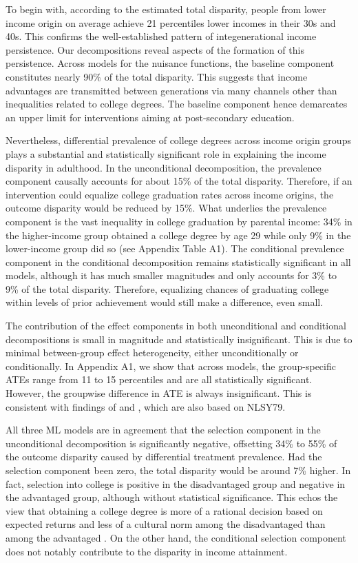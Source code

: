 \documentclass[12pt,a4paper]{article}
\begin{document}
To begin with, according to the estimated total disparity, people from lower income origin on average achieve 21 percentiles lower incomes in their 30s and 40s. This confirms the well-established pattern of integenerational income persistence. Our decompositions reveal aspects of the formation of this persistence. Across models for the nuisance functions, the baseline component constitutes nearly 90\% of the total disparity. This suggests that income advantages are transmitted between generations via many channels other than inequalities related to college degrees. The baseline component hence demarcates an upper limit for interventions aiming at  post-secondary education.

Nevertheless, differential prevalence of college degrees across income origin groups plays a substantial and statistically significant role in explaining the income disparity in adulthood. In the unconditional decomposition, the prevalence component causally accounts for about 15\% of the total disparity. Therefore, if an intervention could equalize college graduation rates across income origins, the outcome disparity would be reduced by 15\%. What underlies the prevalence component is the vast inequality in college graduation by parental income: 34\% in the higher-income group obtained a college degree by age 29 while only 9\% in the lower-income group did so (see Appendix Table A1). The conditional prevalence component in the conditional decomposition remains statistically significant in all models, although it has much smaller magnitudes and only accounts for 3\% to 9\% of the total disparity. Therefore, equalizing chances of graduating college within levels of prior achievement would still make a difference, even small.

The contribution of the effect components in both unconditional and conditional decompositions is small in magnitude and statistically insignificant. This is due to minimal between-group effect heterogeneity, either unconditionally or conditionally. In Appendix A1, we show that across models, the group-specific ATEs range from 11 to 15 percentiles and are all statistically significant. However, the groupwise difference in ATE is always insignificant. This is consistent with findings of \citet{zhou_equalization_2019} and \citet{fiel_great_2020}, which are also based on NLSY79. 

All three ML models are in agreement that the selection component in the unconditional decomposition is significantly negative, offsetting 34\% to 55\% of the outcome disparity caused by differential treatment prevalence. Had the selection component been zero, the total disparity would be around 7\% higher. In fact, selection into college is positive in the disadvantaged group and negative in the advantaged group, although without statistical significance. This echos the view that obtaining a college degree is more of a rational decision based on expected returns and less of a cultural norm among the disadvantaged than among the advantaged \citep{mare_social_1980, hout_social_2012}. On the other hand, the conditional selection component does not notably contribute to the disparity in income attainment. 
\end{document}
